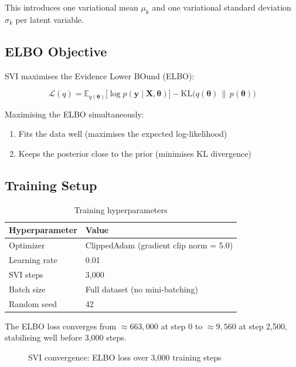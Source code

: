 \documentclass[12pt,a4paper]{article}
\begin{document}
This introduces one variational mean $\mu_k$ and one variational
standard deviation $\sigma_k$ per latent variable.

\subsection{ELBO Objective}

SVI maximises the Evidence Lower BOund (ELBO):

\begin{equation}
  \mathcal{L}(q) = \mathbb{E}_{q(\boldsymbol{\theta})}
    \bigl[\log p(\mathbf{y} \mid \mathbf{X}, \boldsymbol{\theta})\bigr]
    - \mathrm{KL}\bigl(q(\boldsymbol{\theta}) \,\|\, p(\boldsymbol{\theta})\bigr)
\end{equation}

Maximising the ELBO simultaneously:
\begin{enumerate}
  \item Fits the data well (maximises the expected log-likelihood)
  \item Keeps the posterior close to the prior (minimises KL divergence)
\end{enumerate}

\subsection{Training Setup}

\begin{table}[H]
\centering
\begin{tabular}{ll}
\toprule
\textbf{Hyperparameter} & \textbf{Value} \\
\midrule
Optimizer       & ClippedAdam (gradient clip norm = 5.0) \\
Learning rate   & 0.01 \\
SVI steps       & 3,000 \\
Batch size      & Full dataset (no mini-batching) \\
Random seed     & 42 \\
\bottomrule
\end{tabular}
\caption{Training hyperparameters}
\end{table}

The ELBO loss converges from $\approx663{,}000$ at step 0 to
$\approx9{,}560$ at step 2,500, stabilising well before 3,000 steps.

\begin{figure}[H]
  \centering
  \caption{SVI convergence: ELBO loss over 3,000 training steps}
\end{figure}
\end{document}
